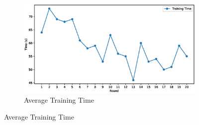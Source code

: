\documentclass[12pt]{article}
\begin{document}
\begin{figure}[hbt!]
\medskip
\begin{subfigure}[b]{\linewidth}
  \includegraphics[width=\linewidth]{avg-training}
  \caption{Average Training Time}
  \label{fig:training_time}
\end{subfigure}
\end{figure}
\end{document}
